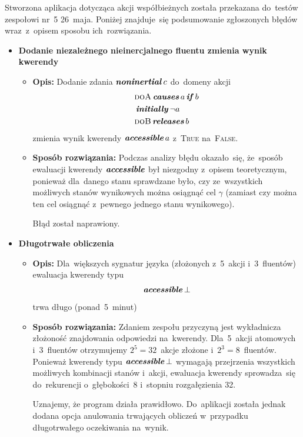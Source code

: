 \documentclass[11pt,a4paper]{article}
\DeclareMathOperator{\Initially}{\textbf{\textit{initially}}}
\DeclareMathOperator{\Causes}{\textbf{\textit{causes}}}
\DeclareMathOperator{\If}{\textbf{\textit{if}}}
\DeclareMathOperator{\Releases}{\textbf{\textit{releases}}}
\DeclareMathOperator{\Noninertial}{\textbf{\textit{noninertial}}}
\DeclareMathOperator{\Accessible}{\textbf{\textit{accessible}}}
\begin{document}
Stworzona aplikacja dotycząca akcji współbieżnych została przekazana do~testów zespołowi nr~5 26~maja.
Poniżej znajduje~się podsumowanie zgłoszonych błędów wraz~z~opisem sposobu ich~rozwiązania.

\begin{itemize}
    \item \textbf{Dodanie niezależnego nieinercjalnego fluentu zmienia wynik kwerendy}
    \begin{itemize}
        \item \textbf{Opis:}
        Dodanie zdania $\Noninertial c$ do~domeny akcji
        \begin{align*}
            & \textsc{doA} \Causes a \If b \\
            & \Initially \neg a \\
            & \textsc{doB} \Releases b
        \end{align*}
        zmienia wynik kwerendy $\Accessible a$ z~\textsc{True} na~\textsc{False}.
        \item \textbf{Sposób rozwiązania:}
        Podczas analizy błędu okazało~się, że~sposób ewaluacji kwerendy $\Accessible$ był niezgodny z~opisem teoretycznym, ponieważ dla~danego stanu sprawdzane było, czy ze~wszystkich możliwych stanów wynikowych można osiągnąć cel $\gamma$ (zamiast czy można ten cel osiągnąć z~pewnego jednego stanu wynikowego).

        Błąd został naprawiony.
    \end{itemize}
    \item \textbf{Długotrwałe obliczenia}
    \begin{itemize}
        \item \textbf{Opis:}
        Dla~większych sygnatur języka (złożonych z~5~akcji i~3~fluentów) ewaluacja kwerendy typu
        $$ \Accessible \bot $$
        trwa długo (ponad~5~minut)
        \item \textbf{Sposób rozwiązania:}
        Zdaniem zespołu przyczyną jest wykładnicza złożoność znajdowania odpowiedzi na~kwerendy.
        Dla~5~akcji atomowych i~3~fluentów otrzymujemy $2^5 = 32$~akcje złożone i~$2^3 = 8$~fluentów.
        Ponieważ kwerendy typu $\Accessible \bot$ wymagają przejrzenia wszystkich możliwych kombinacji stanów i~akcji, ewaluacja kwerendy sprowadza~się do~rekurencji o~głębokości~8 i~stopniu rozgałęzienia 32.

        Uznajemy, że program działa prawidłowo.
        Do~aplikacji została jednak dodana opcja anulowania trwających obliczeń w~przypadku długotrwałego oczekiwania na~wynik.
    \end{itemize}
\end{itemize}
\end{document}
